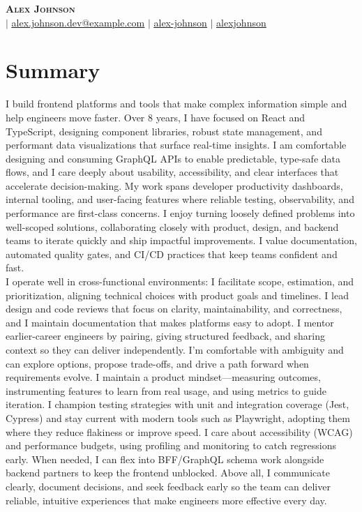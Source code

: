 \documentclass[letterpaper,11pt]{article}
\begin{document}
\begin{center}
    \textbf{\Huge \scshape Alex Johnson} \\ \vspace{1pt}
    \small  $|$ \href{mailto:alex.johnson.dev@example.com}{\underline{alex.johnson.dev@example.com}} $|$
    \href{https://www.linkedin.com/in/alex-johnson}{\underline{alex-johnson}} $|$
    \href{https://github.com/alexjohnson}{\underline{alexjohnson}}
\end{center}
\section{Summary}
  \small{I build frontend platforms and tools that make complex information simple and help engineers move faster. Over 8 years, I have focused on React and TypeScript, designing component libraries, robust state management, and performant data visualizations that surface real-time insights. I am comfortable designing and consuming GraphQL APIs to enable predictable, type-safe data flows, and I care deeply about usability, accessibility, and clear interfaces that accelerate decision-making. My work spans developer productivity dashboards, internal tooling, and user-facing features where reliable testing, observability, and performance are first-class concerns. I enjoy turning loosely defined problems into well-scoped solutions, collaborating closely with product, design, and backend teams to iterate quickly and ship impactful improvements. I value documentation, automated quality gates, and CI/CD practices that keep teams confident and fast.\\[0.5em]I operate well in cross-functional environments: I facilitate scope, estimation, and prioritization, aligning technical choices with product goals and timelines. I lead design and code reviews that focus on clarity, maintainability, and correctness, and I maintain documentation that makes platforms easy to adopt. I mentor earlier-career engineers by pairing, giving structured feedback, and sharing context so they can deliver independently. I’m comfortable with ambiguity and can explore options, propose trade-offs, and drive a path forward when requirements evolve. I maintain a product mindset—measuring outcomes, instrumenting features to learn from real usage, and using metrics to guide iteration. I champion testing strategies with unit and integration coverage (Jest, Cypress) and stay current with modern tools such as Playwright, adopting them where they reduce flakiness or improve speed. I care about accessibility (WCAG) and performance budgets, using profiling and monitoring to catch regressions early. When needed, I can flex into BFF/GraphQL schema work alongside backend partners to keep the frontend unblocked. Above all, I communicate clearly, document decisions, and seek feedback early so the team can deliver reliable, intuitive experiences that make engineers more effective every day.}
\end{document}
